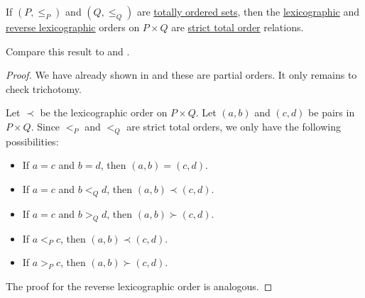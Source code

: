 \begin{proposition}\label{thm:total_lexicographic_order_is_total_order}
  If \( (P, \leq_P) \) and \( (Q, \leq_Q) \) are \hyperref[def:totally_ordered_set]{totally ordered sets}, then the \hyperref[eq:def:lexicographic_order]{lexicographic} and \hyperref[eq:def:lexicographic_order/reverse]{reverse lexicographic} orders on \( P \times Q \) are \hyperref[def:totally_ordered_set]{strict total order} relations.

  Compare this result to  and .
\end{proposition}
\begin{proof}
  We have already shown in  and these are partial orders. It only remains to check trichotomy.

   Let \( \prec \) be the lexicographic order on \( P \times Q \). Let \( (a, b) \) and \( (c, d) \) be pairs in \( P \times Q \). Since \( <_P \) and \( <_Q \) are strict total orders, we only have the following possibilities:
  \begin{itemize}
    \item If \( a = c \) and \( b = d \), then \( (a, b) = (c, d) \).
    \item If \( a = c \) and \( b <_Q d \), then \( (a, b) \prec (c, d) \).
    \item If \( a = c \) and \( b >_Q d \), then \( (a, b) \succ (c, d) \).
    \item If \( a <_P c \), then \( (a, b) \prec (c, d) \).
    \item If \( a >_P c \), then \( (a, b) \succ (c, d) \).
  \end{itemize}

  The proof for the reverse lexicographic order is analogous.
\end{proof}

